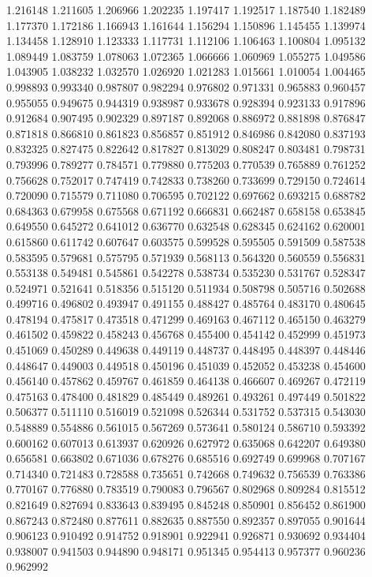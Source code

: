 1.216148
1.211605
1.206966
1.202235
1.197417
1.192517
1.187540
1.182489
1.177370
1.172186
1.166943
1.161644
1.156294
1.150896
1.145455
1.139974
1.134458
1.128910
1.123333
1.117731
1.112106
1.106463
1.100804
1.095132
1.089449
1.083759
1.078063
1.072365
1.066666
1.060969
1.055275
1.049586
1.043905
1.038232
1.032570
1.026920
1.021283
1.015661
1.010054
1.004465
0.998893
0.993340
0.987807
0.982294
0.976802
0.971331
0.965883
0.960457
0.955055
0.949675
0.944319
0.938987
0.933678
0.928394
0.923133
0.917896
0.912684
0.907495
0.902329
0.897187
0.892068
0.886972
0.881898
0.876847
0.871818
0.866810
0.861823
0.856857
0.851912
0.846986
0.842080
0.837193
0.832325
0.827475
0.822642
0.817827
0.813029
0.808247
0.803481
0.798731
0.793996
0.789277
0.784571
0.779880
0.775203
0.770539
0.765889
0.761252
0.756628
0.752017
0.747419
0.742833
0.738260
0.733699
0.729150
0.724614
0.720090
0.715579
0.711080
0.706595
0.702122
0.697662
0.693215
0.688782
0.684363
0.679958
0.675568
0.671192
0.666831
0.662487
0.658158
0.653845
0.649550
0.645272
0.641012
0.636770
0.632548
0.628345
0.624162
0.620001
0.615860
0.611742
0.607647
0.603575
0.599528
0.595505
0.591509
0.587538
0.583595
0.579681
0.575795
0.571939
0.568113
0.564320
0.560559
0.556831
0.553138
0.549481
0.545861
0.542278
0.538734
0.535230
0.531767
0.528347
0.524971
0.521641
0.518356
0.515120
0.511934
0.508798
0.505716
0.502688
0.499716
0.496802
0.493947
0.491155
0.488427
0.485764
0.483170
0.480645
0.478194
0.475817
0.473518
0.471299
0.469163
0.467112
0.465150
0.463279
0.461502
0.459822
0.458243
0.456768
0.455400
0.454142
0.452999
0.451973
0.451069
0.450289
0.449638
0.449119
0.448737
0.448495
0.448397
0.448446
0.448647
0.449003
0.449518
0.450196
0.451039
0.452052
0.453238
0.454600
0.456140
0.457862
0.459767
0.461859
0.464138
0.466607
0.469267
0.472119
0.475163
0.478400
0.481829
0.485449
0.489261
0.493261
0.497449
0.501822
0.506377
0.511110
0.516019
0.521098
0.526344
0.531752
0.537315
0.543030
0.548889
0.554886
0.561015
0.567269
0.573641
0.580124
0.586710
0.593392
0.600162
0.607013
0.613937
0.620926
0.627972
0.635068
0.642207
0.649380
0.656581
0.663802
0.671036
0.678276
0.685516
0.692749
0.699968
0.707167
0.714340
0.721483
0.728588
0.735651
0.742668
0.749632
0.756539
0.763386
0.770167
0.776880
0.783519
0.790083
0.796567
0.802968
0.809284
0.815512
0.821649
0.827694
0.833643
0.839495
0.845248
0.850901
0.856452
0.861900
0.867243
0.872480
0.877611
0.882635
0.887550
0.892357
0.897055
0.901644
0.906123
0.910492
0.914752
0.918901
0.922941
0.926871
0.930692
0.934404
0.938007
0.941503
0.944890
0.948171
0.951345
0.954413
0.957377
0.960236
0.962992
